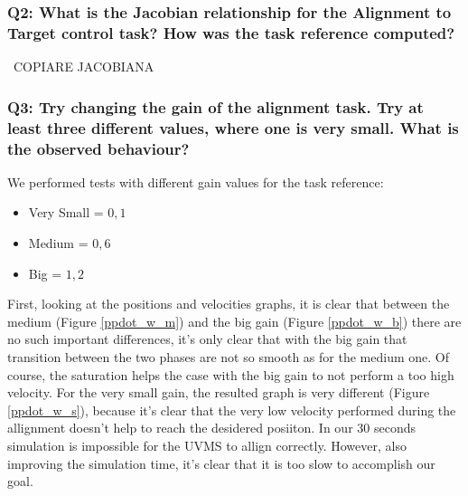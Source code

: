 \documentclass{article}
\newcommand{\ocio} {\marginpar{!}}
\newcommand{\no} {\marginpar{‡}}
\begin{document}
\subsubsection{Q2: What is the Jacobian relationship for the Alignment to Target control task? How was the task reference computed?} \
COPIARE JACOBIANA \ocio

\subsubsection{Q3: Try changing the gain of the alignment task. Try at least three different values, where one is very small. What is the observed behaviour?} \no
We performed tests with different gain values for the task reference:
\begin{itemize}
	\item Very Small = $0,1$
	\item Medium = $0,6$
	\item Big = $1,2$
\end{itemize}
First, looking at the positions and velocities graphs, it is clear that between the medium (Figure \ref{ppdot_w_m}) and the big gain (Figure \ref{ppdot_w_b}) there are no such important differences, it's only clear that with the big gain that transition between the two phases are not so smooth as for the medium one. Of course, the saturation helps the case with the big gain to not perform a too high velocity. 
For the very small gain, the resulted graph is very different (Figure \ref{ppdot_w_s}), because it's clear that the very low velocity performed during the allignment doesn't help to reach the desidered posiiton. In our 30 seconds simulation is impossible for the UVMS to allign correctly. However, also improving the simulation time, it's clear that it is too slow to accomplish our goal.
\end{document}
